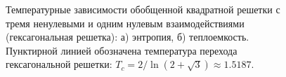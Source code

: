 \documentclass[utf8,12pt]{jetp}
\begin{document}
\begin{figure}[h]
	\begin{minipage}[h]{0.5\linewidth}
	\end{minipage}
	\hfill
	\begin{minipage}[h]{0.5\linewidth}
	\end{minipage}
	\caption{Температурные зависимости обобщенной квадратной решетки с тремя ненулевыми и одним нулевым взаимодействиями (гексагональная решетка): а) энтропия, б) теплоемкость. Пунктирной линией обозначена температура перехода гексагональной решетки: $T_c = 2/\ln(2+\sqrt{3})\approx 1.5187$.}
	\label{Hex}
\end{figure}
\end{document}
